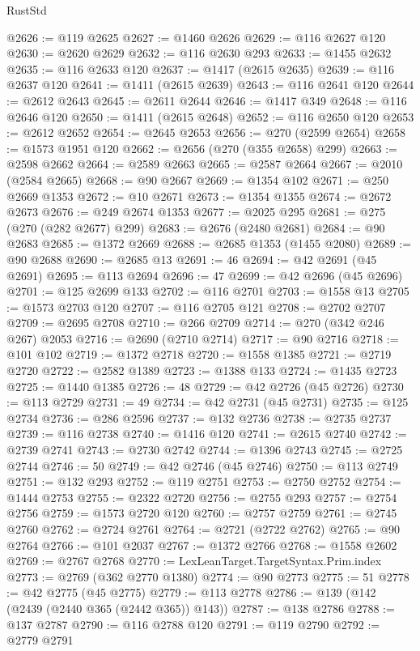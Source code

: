 \begin{lexlean}{RustStd}
\begin{coremodule}
@2626 := @119 @2625
@2627 := @1460 @2626
@2629 := @116 @2627 @120
@2630 := @2620 @2629
@2632 := @116 @2630 @293
@2633 := @1455 @2632
@2635 := @116 @2633 @120
@2637 := @1417 (@2615 @2635)
@2639 := @116 @2637 @120
@2641 := @1411 (@2615 @2639)
@2643 := @116 @2641 @120
@2644 := @2612 @2643
@2645 := @2611 @2644
@2646 := @1417 @349
@2648 := @116 @2646 @120
@2650 := @1411 (@2615 @2648)
@2652 := @116 @2650 @120
@2653 := @2612 @2652
@2654 := @2645 @2653
@2656 := @270 (@2599 @2654)
@2658 := @1573 @1951 @120
@2662 := @2656 (@270 (@355 @2658) @299)
@2663 := @2598 @2662
@2664 := @2589 @2663
@2665 := @2587 @2664
@2667 := @2010 (@2584 @2665)
@2668 := @90 @2667
@2669 := @1354 @102
@2671 := @250 @2669 @1353
@2672 := @10 @2671
@2673 := @1354 @1355
@2674 := @2672 @2673
@2676 := @249 @2674 @1353
@2677 := @2025 @295
@2681 := @275 (@270 (@282 @2677) @299)
@2683 := @2676 (@2480 @2681)
@2684 := @90 @2683
@2685 := @1372 @2669
@2688 := @2685 @1353 (@1455 @2080)
@2689 := @90 @2688
@2690 := @2685 @13
@2691 := 46
@2694 := @42 @2691 (@45 @2691)
@2695 := @113 @2694
@2696 := 47
@2699 := @42 @2696 (@45 @2696)
@2701 := @125 @2699 @133
@2702 := @116 @2701
@2703 := @1558 @13
@2705 := @1573 @2703 @120
@2707 := @116 @2705 @121
@2708 := @2702 @2707
@2709 := @2695 @2708
@2710 := @266 @2709
@2714 := @270 (@342 @246 @267) @2053
@2716 := @2690 (@2710 @2714)
@2717 := @90 @2716
@2718 := @101 @102
@2719 := @1372 @2718
@2720 := @1558 @1385
@2721 := @2719 @2720
@2722 := @2582 @1389
@2723 := @1388 @133
@2724 := @1435 @2723
@2725 := @1440 @1385
@2726 := 48
@2729 := @42 @2726 (@45 @2726)
@2730 := @113 @2729
@2731 := 49
@2734 := @42 @2731 (@45 @2731)
@2735 := @125 @2734
@2736 := @286 @2596
@2737 := @132 @2736
@2738 := @2735 @2737
@2739 := @116 @2738
@2740 := @1416 @120
@2741 := @2615 @2740
@2742 := @2739 @2741
@2743 := @2730 @2742
@2744 := @1396 @2743
@2745 := @2725 @2744
@2746 := 50
@2749 := @42 @2746 (@45 @2746)
@2750 := @113 @2749
@2751 := @132 @293
@2752 := @119 @2751
@2753 := @2750 @2752
@2754 := @1444 @2753
@2755 := @2322 @2720
@2756 := @2755 @293
@2757 := @2754 @2756
@2759 := @1573 @2720 @120
@2760 := @2757 @2759
@2761 := @2745 @2760
@2762 := @2724 @2761
@2764 := @2721 (@2722 @2762)
@2765 := @90 @2764
@2766 := @101 @2037
@2767 := @1372 @2766
@2768 := @1558 @2602
@2769 := @2767 @2768
@2770 := LexLeanTarget.TargetSyntax.Prim.index
@2773 := @2769 (@362 @2770 @1380)
@2774 := @90 @2773
@2775 := 51
@2778 := @42 @2775 (@45 @2775)
@2779 := @113 @2778
@2786 := @139 (@142 (@2439 (@2440 @365 (@2442 @365)) @143))
@2787 := @138 @2786
@2788 := @137 @2787
@2790 := @116 @2788 @120
@2791 := @119 @2790
@2792 := @2779 @2791

\end{coremodule}
\end{lexlean}
